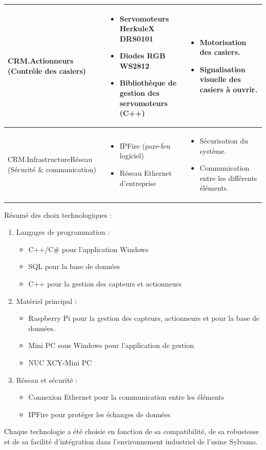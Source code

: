 \documentclass[main.tex]{subfiles}
\begin{document}
\begin{longtable}{|p{4.5cm}|p{5.5cm}|p{6cm}|}
CRM.Actionneurs (Contrôle des casiers) & 
\begin{itemize}
  \item Servomoteurs HerkuleX DRS0101
  \item Diodes RGB WS2812
  \item Bibliothèque de gestion des servomoteurs (C++)
\end{itemize} &
\begin{itemize}
  \item Motorisation des casiers.
  \item Signalisation visuelle des casiers à ouvrir.
\end{itemize} \\
\hline

CRM.InfrastructureRéseau (Sécurité \& communication) & 
\begin{itemize}
  \item IPFire (pare-feu logiciel)
  \item Réseau Ethernet d’entreprise
\end{itemize} &
\begin{itemize}
  \item Sécurisation du système.
  \item Communication entre les différents éléments.
\end{itemize} \\
\hline

\end{longtable}

Résumé des choix technologiques :

\begin{enumerate}

\item Langages de programmation :
	\begin{itemize}
	\item C++/C\# pour l’application Windows
	\item SQL pour la base de données
	\item C++ pour la gestion des capteurs et actionneurs
	\end{itemize}
\item Matériel principal :
	\begin{itemize}
	\item Raspberry Pi pour la gestion des capteurs, actionneurs et pour la base de données.
	\item Mini PC sous Windows pour l’application de gestion
	\item NUC XCY-Mini PC
	\end{itemize}
\item Réseau et sécurité :
	\begin{itemize}
	\item Connexion Ethernet pour la communication entre les éléments
	\item IPFire pour protéger les échanges de données
	\end{itemize}
	
\end{enumerate}

Chaque technologie a été choisie en fonction de sa compatibilité, de sa robustesse et de sa facilité d’intégration dans l’environnement industriel de l’usine Sylvamo.

\newpage
\end{document}
